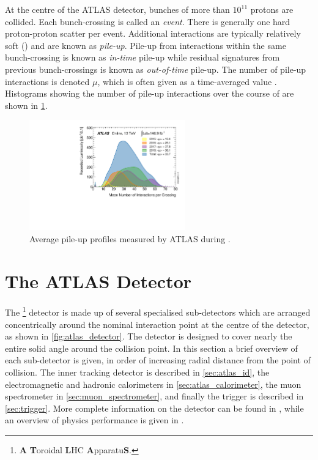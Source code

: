 At the centre of the ATLAS detector, bunches of more than $10^{11}$ protons are collided.
Each bunch-crossing is called an \textit{event}.
There is generally one hard proton-proton scatter per event.
Additional interactions are typically relatively soft (\lowpt) and are known as \textit{pile-up}.
Pile-up from interactions within the same bunch-crossing is known as \textit{in-time} pile-up while residual signatures from previous bunch-crossings is known as \textit{out-of-time} pile-up.
The number of pile-up interactions is denoted $\mu$, which is often given as a time-averaged value \angles{\mu}.
Histograms showing the number of pile-up interactions over the course of \runtwo are shown in \cref{fig:run2_pile-up}.
%
\begin{figure}[!htbp]
  \centering
  \includegraphics[width=0.6\textwidth]{chapters/2.detector/figs/mu_2015_2018.pdf}
  \caption{
    Average pile-up profiles measured by ATLAS during \runtwo \cite{atlas-lumi-run2}.
  }
  \label{fig:run2_pile-up}
\end{figure}
%


\section{The ATLAS Detector}\label{sec:atlas_detector}

The \ATLAS\footnote{\textbf{A} \textbf{T}oroidal \textbf{L}HC \textbf{A}pparatu\textbf{S}.} detector is made up of several specialised sub-detectors which are arranged concentrically around the nominal interaction point at the centre of the detector, as shown in \cref{fig:atlas_detector}.
The detector is designed to cover nearly the entire solid angle around the collision point.
In this section a brief overview of each sub-detector is given, in order of increasing radial distance from the point of collision.
The inner tracking detector is described in \cref{sec:atlas_id}, the electromagnetic and hadronic calorimeters in \cref{sec:atlas_calorimeter}, the muon spectrometer in \cref{sec:muon_spectrometer}, and finally the trigger is described in \cref{sec:trigger}.
More complete information on the detector can be found in , while an overview of physics performance is given in \cite{ATLAS-TDR-14}.

